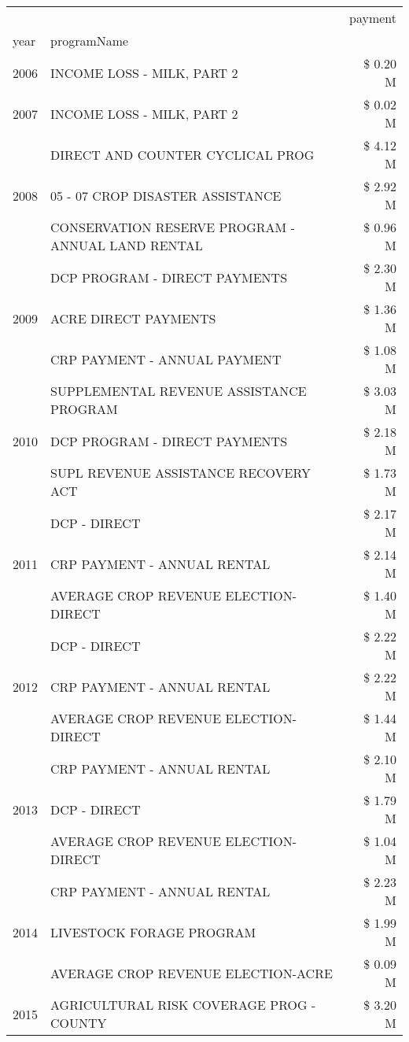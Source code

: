 \begin{tabular}{llr}
\toprule
 &  & payment \\
year & programName &  \\
\midrule
2006 & INCOME LOSS - MILK, PART 2 & \$ 0.20 M \\
\cline{1-3}
2007 & INCOME LOSS - MILK, PART 2 & \$ 0.02 M \\
\cline{1-3}
\multirow[t]{3}{*}{2008} & DIRECT AND COUNTER CYCLICAL PROG & \$ 4.12 M \\
 & 05 - 07 CROP DISASTER ASSISTANCE & \$ 2.92 M \\
 & CONSERVATION RESERVE PROGRAM - ANNUAL LAND RENTAL & \$ 0.96 M \\
\cline{1-3}
\multirow[t]{3}{*}{2009} & DCP PROGRAM - DIRECT PAYMENTS & \$ 2.30 M \\
 & ACRE DIRECT PAYMENTS & \$ 1.36 M \\
 & CRP PAYMENT - ANNUAL PAYMENT & \$ 1.08 M \\
\cline{1-3}
\multirow[t]{3}{*}{2010} & SUPPLEMENTAL REVENUE ASSISTANCE PROGRAM & \$ 3.03 M \\
 & DCP PROGRAM - DIRECT PAYMENTS & \$ 2.18 M \\
 & SUPL REVENUE ASSISTANCE RECOVERY ACT & \$ 1.73 M \\
\cline{1-3}
\multirow[t]{3}{*}{2011} & DCP - DIRECT & \$ 2.17 M \\
 & CRP PAYMENT - ANNUAL RENTAL & \$ 2.14 M \\
 & AVERAGE CROP REVENUE ELECTION-DIRECT & \$ 1.40 M \\
\cline{1-3}
\multirow[t]{3}{*}{2012} & DCP - DIRECT & \$ 2.22 M \\
 & CRP PAYMENT - ANNUAL RENTAL & \$ 2.22 M \\
 & AVERAGE CROP REVENUE ELECTION-DIRECT & \$ 1.44 M \\
\cline{1-3}
\multirow[t]{3}{*}{2013} & CRP PAYMENT - ANNUAL RENTAL & \$ 2.10 M \\
 & DCP - DIRECT & \$ 1.79 M \\
 & AVERAGE CROP REVENUE ELECTION-DIRECT & \$ 1.04 M \\
\cline{1-3}
\multirow[t]{3}{*}{2014} & CRP PAYMENT - ANNUAL RENTAL & \$ 2.23 M \\
 & LIVESTOCK FORAGE PROGRAM & \$ 1.99 M \\
 & AVERAGE CROP REVENUE ELECTION-ACRE & \$ 0.09 M \\
\cline{1-3}
\multirow[t]{3}{*}{2015} & AGRICULTURAL RISK COVERAGE PROG - COUNTY & \$ 3.20 M \\

\end{tabular}
